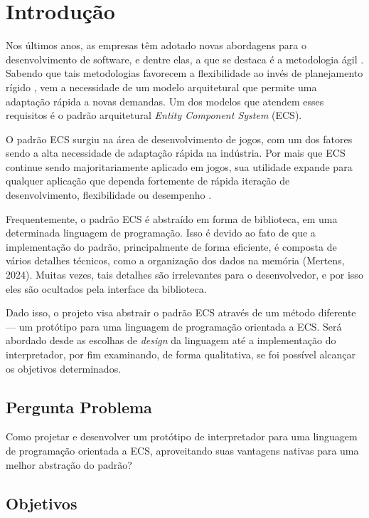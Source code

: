 \chapter{Introdução}\label{ch:introducao}

Nos últimos anos, as empresas têm adotado novas abordagens para o desenvolvimento de software, e dentre elas, a que se destaca é a metodologia ágil \cite{17thstateofagile}. Sabendo que tais metodologias favorecem a flexibilidade ao invés de planejamento rígido \cite{agile}, vem a necessidade de um modelo arquitetural que permite uma adaptação rápida a novas demandas. Um dos modelos que atendem esses requisitos é o padrão arquitetural \textit{Entity Component System} (ECS).

O padrão ECS surgiu na área de desenvolvimento de jogos, com um dos fatores sendo a alta necessidade de adaptação rápida na indústria. Por mais que ECS continue sendo majoritariamente aplicado em jogos, sua utilidade expande para qualquer aplicação que dependa fortemente de rápida iteração de desenvolvimento, flexibilidade ou desempenho \cite{flightdynamics}.

Frequentemente, o padrão ECS é abstraído em forma de biblioteca, em uma determinada linguagem de programação. Isso é devido ao fato de que a implementação do padrão, principalmente de forma eficiente, é composta de vários detalhes técnicos, como a organização dos dados na memória (Mertens, 2024). Muitas vezes, tais detalhes são irrelevantes para o desenvolvedor, e por isso eles são ocultados pela interface da biblioteca.

Dado isso, o projeto visa abstrair o padrão ECS através de um método diferente — um protótipo para uma linguagem de programação orientada a ECS. Será abordado desde as escolhas de \textit{design} da linguagem até a implementação do interpretador, por fim examinando, de forma qualitativa, se foi possível alcançar os objetivos determinados.

\section{Pergunta Problema}

Como projetar e desenvolver um protótipo de interpretador para uma linguagem de programação orientada a ECS, aproveitando suas vantagens nativas para uma melhor abstração do padrão?

\section{Objetivos}

